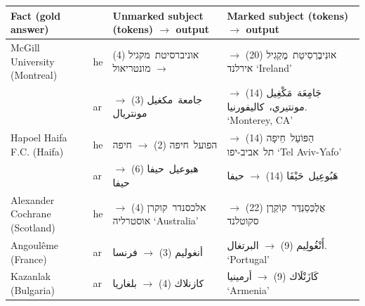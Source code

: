 \documentclass[11pt]{article}
\newcommand{\he}[1]{\mbox{\beginR\hebfont #1\endR}}
\newcommand{\ar}[1]{\mbox{\beginR\arabfont #1\endR}}
\newcommand{\cmark}{\textcolor{good}{\ding{51}}}
\newcommand{\xmark}{\textcolor{bad}{\ding{55}}}
\begin{document}
\begin{table}[t]
\centering\footnotesize
\setlength{\tabcolsep}{6pt}
\renewcommand{\arraystretch}{1.15}
\begin{tabular}{@{}llll@{}}
\toprule
Fact (gold answer) & & Unmarked subject (tokens) $\rightarrow$ output & Marked subject (tokens) $\rightarrow$ output\\
\midrule
McGill University (Montreal) & he & \makecell[l]{\he{אוניברסיטת מקגיל} (4)\\[-1pt]$\rightarrow$ \he{מונטריאול} \cmark} & \makecell[l]{\he{אוּנִיבֶרְסִיטַת מֶקְגִיל} (20)\\[-1pt]$\rightarrow$ \he{אירלנד} `Ireland' \xmark}\\
 & ar & \makecell[l]{\ar{جامعة مكغيل} (3)\\[-1pt]$\rightarrow$ \ar{مونتريال} \cmark} & \makecell[l]{\ar{جَامِعَة مَكْغِيل} (14)\\[-1pt]$\rightarrow$ \ar{مونتيري، كاليفورنيا.} `Monterey, CA' \xmark}\\\addlinespace[2pt]
Hapoel Haifa F.C. (Haifa) & he & \makecell[l]{\he{הפועל חיפה} (2)\\[-1pt]$\rightarrow$ \he{חיפה} \cmark} & \makecell[l]{\he{הַפּוֹעֵל חֵיפָה} (14)\\[-1pt]$\rightarrow$ \he{תל אביב-יפו} `Tel Aviv-Yafo' \xmark}\\
 & ar & \makecell[l]{\ar{هبوعيل حيفا} (6)\\[-1pt]$\rightarrow$ \ar{حيفا} \cmark} & \makecell[l]{\ar{هَبُوعِيل حَيْفَا} (14)\\[-1pt]$\rightarrow$ \ar{حيفا} \cmark}\\\addlinespace[2pt]
Alexander Cochrane (Scotland) & he & \makecell[l]{\he{אלכסנדר קוקרן} (4)\\[-1pt]$\rightarrow$ \he{אוסטרליה} `Australia' \xmark} & \makecell[l]{\he{אֲלֶכְּסַנְדֶּר קוֹקְרֶן} (22)\\[-1pt]$\rightarrow$ \he{סקוטלנד} \cmark}\\\addlinespace[2pt]
Angoul\^eme (France) & ar & \makecell[l]{\ar{أنغوليم} (3)\\[-1pt]$\rightarrow$ \ar{فرنسا} \cmark} & \makecell[l]{\ar{أَنْغُولِيم} (9)\\[-1pt]$\rightarrow$ \ar{البرتغال.} `Portugal' \xmark}\\
Kazanlak (Bulgaria) & ar & \makecell[l]{\ar{كازنلاك} (4)\\[-1pt]$\rightarrow$ \ar{بلغاريا} \cmark} & \makecell[l]{\ar{كَازَنْلَاك} (9)\\[-1pt]$\rightarrow$ \ar{أرمينيا} `Armenia' \xmark}\\

\end{tabular}
\end{table}
\end{document}
